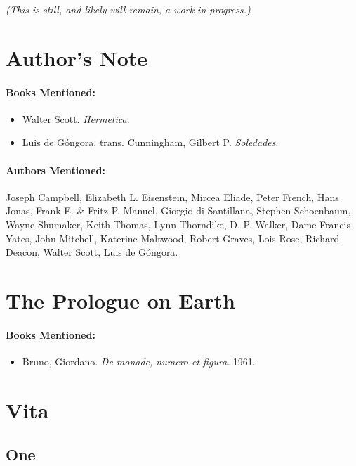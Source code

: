 \documentclass[12pt]{article}
\providecommand{\tightlist}{%
  \setlength{\itemsep}{0pt}\setlength{\parskip}{0pt}}
\begin{document}
\emph{(This is still, and likely will remain, a work in progress.)}

\pagebreak 
\section{Author's Note}\label{authors-note}

\paragraph{Books Mentioned:}\label{books-mentioned}

\begin{itemize}
\tightlist
\item
  Walter Scott. \emph{Hermetica}.
\item
  Luis de Góngora, trans. Cunningham, Gilbert P. \emph{Soledades}.
\end{itemize}

\paragraph{Authors Mentioned:}\label{authors-mentioned}
Joseph Campbell, Elizabeth L. Eisenstein, Mircea Eliade, Peter French, Hans Jonas, Frank E. \& Fritz P. Manuel, Giorgio di Santillana, Stephen Schoenbaum, Wayne Shumaker, Keith Thomas, Lynn Thorndike, D. P. Walker, Dame Francis Yates, John Mitchell, Katerine Maltwood, Robert Graves, Lois Rose, Richard Deacon, Walter Scott, Luis de Góngora.

\section{The Prologue on Earth}\label{the-prologue-on-earth}

\paragraph{Books Mentioned:}\label{books-mentioned-1}

\begin{itemize}
\tightlist
\item
  Bruno, Giordano. \emph{De monade, numero et figura}. 1961.
\end{itemize}

\section{Vita}\label{vita}

\subsection{One}\label{one}
\end{document}
